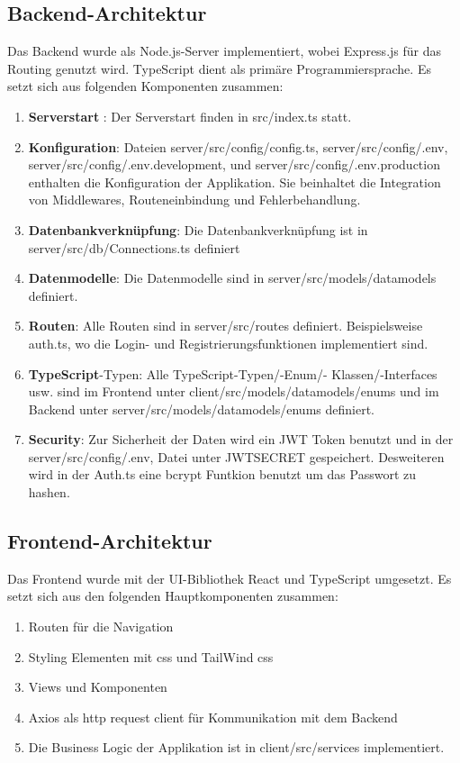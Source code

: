 \documentclass[conference,a4paper,flushend]{cs-techrep}
\begin{document}
\subsection{Backend-Architektur}
Das Backend wurde als Node.js-Server implementiert, wobei Express.js für das Routing genutzt wird.
TypeScript dient als primäre Programmiersprache. Es setzt sich aus folgenden
Komponenten zusammen:
\begin{enumerate}
\item \textbf{Serverstart} : Der Serverstart  finden in
src/index.ts statt.
\item \textbf{Konfiguration}: Dateien server/src/config/config.ts, server/src/config/.env, server/src/config/.env.development, 
und server/src/config/.env.production enthalten die Konfiguration der Applikation. Sie beinhaltet die
Integration von Middlewares, Routeneinbindung und Fehlerbehandlung.
\item  \textbf{Datenbankverknüpfung}: Die Datenbankverknüpfung ist in server/src/db/Connections.ts definiert
\item  \textbf{Datenmodelle}: Die Datenmodelle sind in server/src/models/datamodels definiert.
\item  \textbf{Routen}: Alle Routen sind in server/src/routes definiert. Beispielsweise auth.ts, wo die Login- und Registrierungsfunktionen implementiert sind.
\item  \textbf{TypeScript}-Typen: Alle TypeScript-Typen/-Enum/- Klassen/-Interfaces usw. sind im Frontend unter  client/src/models/datamodels/enums und im Backend unter server/src/models/datamodels/enums definiert.
\item  \textbf{Security}: Zur Sicherheit der Daten wird ein  JWT Token benutzt und in der server/src/config/.env, Datei unter JWTSECRET gespeichert. Desweiteren wird in der Auth.ts eine bcrypt Funtkion benutzt um das Passwort zu hashen.
\end{enumerate}
\subsection{Frontend-Architektur}
Das Frontend wurde mit der UI-Bibliothek React und TypeScript umgesetzt. Es setzt sich aus den folgenden Hauptkomponenten zusammen:

\begin{enumerate}
    \item Routen für die Navigation
    \item Styling Elementen mit css und TailWind css
    \item Views und Komponenten
    \item Axios als http request client für Kommunikation mit dem Backend
    \item Die Business Logic der Applikation ist in client/src/services implementiert.
\end{enumerate}
\end{document}
